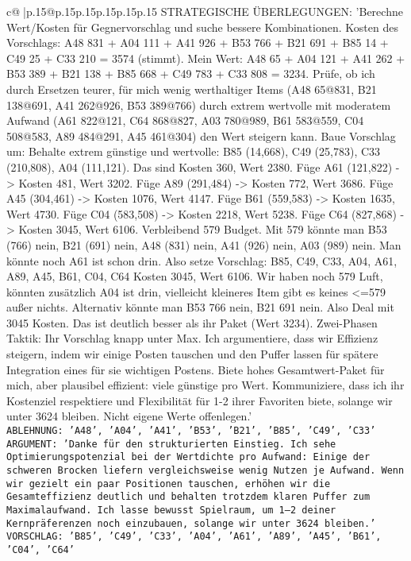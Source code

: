 \documentclass{article}
\begin{document}
{\begin{supertabular}{c@{$\;$}|p{.15\linewidth}@{}p{.15\linewidth}p{.15\linewidth}p{.15\linewidth}p{.15\linewidth}p{.15\linewidth}}
{{{	 STRATEGISCHE ÜBERLEGUNGEN: {'Berechne Wert/Kosten für Gegnervorschlag und suche bessere Kombinationen. Kosten des Vorschlags: A48 831 + A04 111 + A41 926 + B53 766 + B21 691 + B85 14 + C49 25 + C33 210 = 3574 (stimmt). Mein Wert: A48 65 + A04 121 + A41 262 + B53 389 + B21 138 + B85 668 + C49 783 + C33 808 = 3234. Prüfe, ob ich durch Ersetzen teurer, für mich wenig werthaltiger Items (A48 65@831, B21 138@691, A41 262@926, B53 389@766) durch extrem wertvolle mit moderatem Aufwand (A61 822@121, C64 868@827, A03 780@989, B61 583@559, C04 508@583, A89 484@291, A45 461@304) den Wert steigern kann. Baue Vorschlag um: Behalte extrem günstige und wertvolle: B85 (14,668), C49 (25,783), C33 (210,808), A04 (111,121). Das sind Kosten 360, Wert 2380. Füge A61 (121,822) -> Kosten 481, Wert 3202. Füge A89 (291,484) -> Kosten 772, Wert 3686. Füge A45 (304,461) -> Kosten 1076, Wert 4147. Füge B61 (559,583) -> Kosten 1635, Wert 4730. Füge C04 (583,508) -> Kosten 2218, Wert 5238. Füge C64 (827,868) -> Kosten 3045, Wert 6106. Verbleibend 579 Budget. Mit 579 könnte man B53 (766) nein, B21 (691) nein, A48 (831) nein, A41 (926) nein, A03 (989) nein. Man könnte noch A61 ist schon drin. Also setze Vorschlag: {B85, C49, C33, A04, A61, A89, A45, B61, C04, C64} Kosten 3045, Wert 6106. Wir haben noch 579 Luft, könnten zusätzlich A04 ist drin, vielleicht kleineres Item gibt es keines <=579 außer nichts. Alternativ könnte man B53 766 nein, B21 691 nein. Also Deal mit 3045 Kosten. Das ist deutlich besser als ihr Paket (Wert 3234). Zwei-Phasen Taktik: Ihr Vorschlag knapp unter Max. Ich argumentiere, dass wir Effizienz steigern, indem wir einige Posten tauschen und den Puffer lassen für spätere Integration eines für sie wichtigen Postens. Biete hohes Gesamtwert-Paket für mich, aber plausibel effizient: viele günstige pro Wert. Kommuniziere, dass ich ihr Kostenziel respektiere und Flexibilität für 1-2 ihrer Favoriten biete, solange wir unter 3624 bleiben. Nicht eigene Werte offenlegen.'}\\ \tt ABLEHNUNG: {'A48', 'A04', 'A41', 'B53', 'B21', 'B85', 'C49', 'C33'}\\ \tt ARGUMENT: {'Danke für den strukturierten Einstieg. Ich sehe Optimierungspotenzial bei der Wertdichte pro Aufwand: Einige der schweren Brocken liefern vergleichsweise wenig Nutzen je Aufwand. Wenn wir gezielt ein paar Positionen tauschen, erhöhen wir die Gesamteffizienz deutlich und behalten trotzdem klaren Puffer zum Maximalaufwand. Ich lasse bewusst Spielraum, um 1–2 deiner Kernpräferenzen noch einzubauen, solange wir unter 3624 bleiben.'}\\ \tt VORSCHLAG: {'B85', 'C49', 'C33', 'A04', 'A61', 'A89', 'A45', 'B61', 'C04', 'C64'} 
	  } 
	   } 
	   } 
	  \\ 
 


\end{supertabular}}
\end{document}
